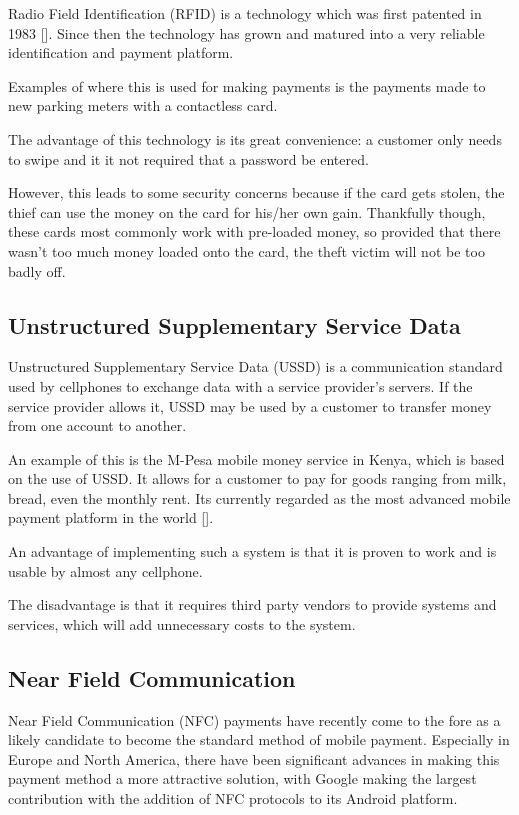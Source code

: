 Radio Field Identification (RFID) is a technology which was first patented in 1983
[\cite{patent:nfc-patent}]. Since then the technology has grown and matured into a very
reliable identification and payment platform. 

Examples of where this is used for making payments is the payments made to new parking meters
with a contactless card. 

The advantage of this technology is its great convenience: a customer only needs to swipe and
it it not required that a password be entered.

However, this leads to some security concerns because if the card gets stolen, the thief can
use the money on the card for his/her own gain. Thankfully though, these cards most commonly
work with pre-loaded money, so provided that there wasn't too much money loaded onto the card,
the theft victim will not be too badly off. 

\subsection{Unstructured Supplementary Service Data}

Unstructured Supplementary Service Data (USSD) is a communication standard used by cellphones
to exchange data with a service provider's servers. If the service provider allows it, USSD may
be used by a customer to transfer money from one account to another. 

An example of this is the M-Pesa mobile money service in Kenya, which is based on the use of
USSD. It allows for a customer to pay for goods ranging from milk, bread, even the monthly
rent. Its currently regarded as the most advanced mobile payment platform in the world
[\cite{website:m-pesa}]. 

An advantage of implementing such a system is that it is proven to work and is usable by almost
any cellphone.

The disadvantage is that it requires third party vendors to provide systems and services, which
will add unnecessary costs to the system.

\subsection{Near Field Communication}

Near Field Communication (NFC) payments have recently come to the fore as a likely candidate to
become the standard method of mobile payment. Especially in Europe and North America, there
have been significant advances in making this payment method a more attractive solution, with
Google making the largest contribution with the addition of NFC protocols to its Android
platform.


